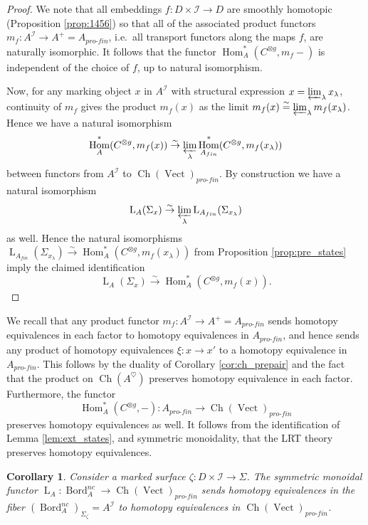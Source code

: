 \documentclass[reqno]{amsart}
\newtheorem{corollary}[lemma]{Corollary}
\theoremstyle{definition}
\newcommand{\mcl}[1]{\mathcal{#1}}
\newcommand{\opn}[1]{\operatorname{#1}}
\newcommand{\ot}{\otimes}
\newcommand{\dL}{\operatorname{L}}
\newcommand{\pf}{pro\text{-}fin}
\DeclareMathOperator{\Hom}{Hom}
\DeclareMathOperator{\Bord}{Bord}
\renewcommand{\1}{\mathbf{1}}
\begin{document}
\begin{proof}
We note that all embeddings $f:D\times \mcl{I}\to D$ are smoothly homotopic (Proposition \ref{prop:1456}) so that all of the associated product functors $m_f:A^{\mcl{I}}\to A^+=A_{\pf}$, i.e.\ all transport functors along the maps $f$, are naturally isomorphic.  It follows that the functor $\Hom^{\ast}_A(C^{\ot g},m_f-)$ is independent of the choice of $f$, up to natural isomorphism.
\par

Now, for any marking object $x$ in $A^{\mcl{I}}$ with structural expression $x=\varprojlim_{\lambda} x_{\lambda}$, continuity of $m_f$ gives the product $m_f(x)$ as the limit $m_f(x)\overset{\sim} =\varprojlim_{\lambda} m_f(x_{\lambda})$.  Hence we have a natural isomorphism
\[
\Hom_{A}^\ast(C^{\ot g},m_f(x))\overset{\sim}\to \varprojlim_{\lambda}\Hom_{A_{fin}}^\ast(C^{\ot g},m_f(x_{\lambda}))
\]
between functors from $A^{\mcl{I}}$ to $\opn{Ch}(\opn{Vect})_{\pf}$.  By construction we have a natural isomorphism
\[
\dL_{A}(\Sigma_x)\overset{\sim}\to \varprojlim_{\lambda}\dL_{A_{fin}}(\Sigma_{x_{\lambda}})
\]
as well. Hence the natural isomorphisms $\dL_{A_{fin}}(\Sigma_{x_{\lambda}})\overset{\sim}\to \Hom_{A}^\ast(C^{\ot g},m_f(x_{\lambda}))$ from Proposition \ref{prop:pre_states} imply the claimed identification
\[
\dL_{A}(\Sigma_x)\overset{\sim}\to \Hom_{A}^\ast(C^{\ot g},m_f(x)).
\]
\end{proof}

We recall that any product functor $m_f:A^{\mcl{I}}\to A^{+}=A_{\pf}$ sends homotopy equivalences in each factor to homotopy equivalences in $A_{\pf}$, and hence sends any product of homotopy equivalences $\xi:x\to x'$ to a homotopy equivalence in $A_{\pf}$. This follows by the duality of Corollary \ref{cor:ch_prepair} and the fact that the product on $\opn{Ch}(A^{\heartsuit})$ preserves homotopy equivalence in each factor. Furthermore, the functor
\[
\Hom_{A}^\ast(C^{\ot g},-):A_{\pf}\to \opn{Ch}(\opn{Vect})_{\pf}
\]
preserves homotopy equivalences as well.  It follows from the identification of Lemma \ref{lem:ext_states}, and symmetric monoidality, that the LRT theory preserves homotopy equivalences.

\begin{corollary}\label{cor:dis_htop}
Consider a marked surface $\zeta:D\times\mcl{I}\to \Sigma$. The symmetric monoidal functor $\dL_{A}:\Bord^{nc}_{A}\to \opn{Ch}(\opn{Vect})_{\pf}$ sends homotopy equivalences in the fiber $(\Bord^{nc}_{A})_{\Sigma_{\zeta}}=A^{\mcl{I}}$ to homotopy equivalences in $\opn{Ch}(\opn{Vect})_{\pf}$.
\end{corollary}
\end{document}
